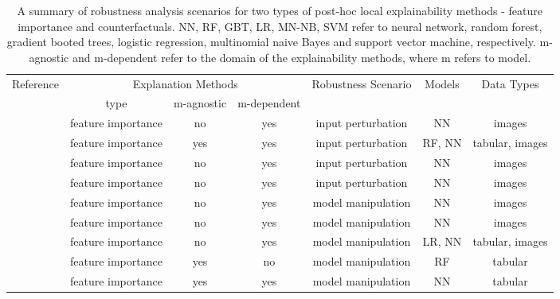 \documentclass[sigconf]{acmart}
\begin{document}

\begin{table*}
  \caption{A summary of robustness analysis scenarios for two types of post-hoc local explainability methods - feature importance and counterfactuals. NN, RF, GBT, LR, MN-NB, SVM refer to neural network, random forest, gradient booted trees, logistic regression, multinomial naive Bayes and support vector machine, respectively. m-agnostic and m-dependent refer to the domain of the explainability methods, where m refers to model.}
  \label{tab:taxonomy}
  \begin{tabular}{ccccccc}
    \toprule
    Reference & \multicolumn{3}{c}{ Explanation Methods} & Robustness Scenario & Models & Data Types\\
    & type & m-agnostic & m-dependent & & \\
    \midrule
    \cite{Kindermans_arXiv_2017} & feature importance & no & yes & input perturbation & NN & images \\
    \cite{Melis_arXiv_2018} & feature importance & yes & yes & input perturbation & RF, NN & tabular, images \\
    \cite{Ghorbani_aaai_2019} & feature importance & no & yes & input perturbation & NN & images \\
    \cite{Dombrowski_neurips_2019} & feature importance & no & yes & input perturbation & NN & images \\

    \cite{Adebayo_neurips_2018} & feature importance & no & yes & model manipulation & NN & images\\
    \cite{Heo_neurips_2019} & feature importance & no & yes  & model manipulation & NN & images\\
    \cite{Anders_arXiv_2020} & feature importance & no & yes & model manipulation & LR, NN & tabular, images \\
    \cite{Slack_aies_2020} & feature importance & yes & no & model manipulation & RF & tabular\\
    \cite{Dimanov_aaai_ws_2020} & feature importance & yes & yes & model manipulation & NN & tabular\\


\end{tabular}
\end{table*}
\end{document}
